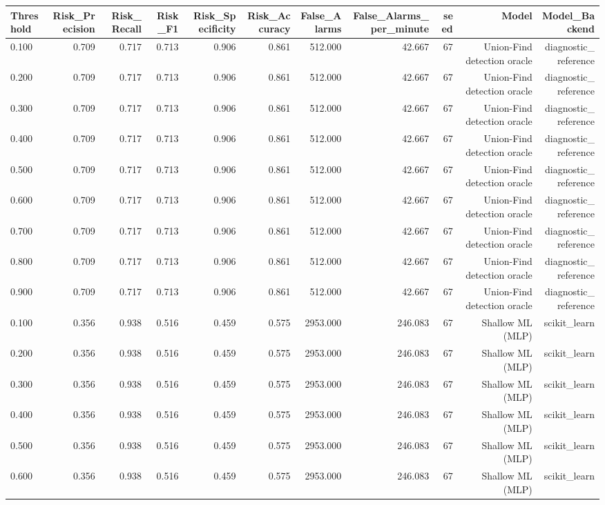 \begin{tabular}{lrrrrrrrrrr}
\toprule
Threshold & Risk\_Precision & Risk\_Recall & Risk\_F1 & Risk\_Specificity & Risk\_Accuracy & False\_Alarms & False\_Alarms\_per\_minute & seed & Model & Model\_Backend \\
\midrule
0.100 & 0.709 & 0.717 & 0.713 & 0.906 & 0.861 & 512.000 & 42.667 & 67 & Union-Find detection oracle & diagnostic\_reference \\
0.200 & 0.709 & 0.717 & 0.713 & 0.906 & 0.861 & 512.000 & 42.667 & 67 & Union-Find detection oracle & diagnostic\_reference \\
0.300 & 0.709 & 0.717 & 0.713 & 0.906 & 0.861 & 512.000 & 42.667 & 67 & Union-Find detection oracle & diagnostic\_reference \\
0.400 & 0.709 & 0.717 & 0.713 & 0.906 & 0.861 & 512.000 & 42.667 & 67 & Union-Find detection oracle & diagnostic\_reference \\
0.500 & 0.709 & 0.717 & 0.713 & 0.906 & 0.861 & 512.000 & 42.667 & 67 & Union-Find detection oracle & diagnostic\_reference \\
0.600 & 0.709 & 0.717 & 0.713 & 0.906 & 0.861 & 512.000 & 42.667 & 67 & Union-Find detection oracle & diagnostic\_reference \\
0.700 & 0.709 & 0.717 & 0.713 & 0.906 & 0.861 & 512.000 & 42.667 & 67 & Union-Find detection oracle & diagnostic\_reference \\
0.800 & 0.709 & 0.717 & 0.713 & 0.906 & 0.861 & 512.000 & 42.667 & 67 & Union-Find detection oracle & diagnostic\_reference \\
0.900 & 0.709 & 0.717 & 0.713 & 0.906 & 0.861 & 512.000 & 42.667 & 67 & Union-Find detection oracle & diagnostic\_reference \\
0.100 & 0.356 & 0.938 & 0.516 & 0.459 & 0.575 & 2953.000 & 246.083 & 67 & Shallow ML (MLP) & scikit\_learn \\
0.200 & 0.356 & 0.938 & 0.516 & 0.459 & 0.575 & 2953.000 & 246.083 & 67 & Shallow ML (MLP) & scikit\_learn \\
0.300 & 0.356 & 0.938 & 0.516 & 0.459 & 0.575 & 2953.000 & 246.083 & 67 & Shallow ML (MLP) & scikit\_learn \\
0.400 & 0.356 & 0.938 & 0.516 & 0.459 & 0.575 & 2953.000 & 246.083 & 67 & Shallow ML (MLP) & scikit\_learn \\
0.500 & 0.356 & 0.938 & 0.516 & 0.459 & 0.575 & 2953.000 & 246.083 & 67 & Shallow ML (MLP) & scikit\_learn \\
0.600 & 0.356 & 0.938 & 0.516 & 0.459 & 0.575 & 2953.000 & 246.083 & 67 & Shallow ML (MLP) & scikit\_learn \\

\end{tabular}
